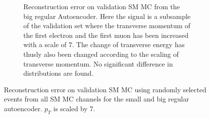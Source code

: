 \begin{figure}[h!]
\begin{subfigure}{.45\textwidth}
        \caption{Reconstruction error on validation SM MC from the big regular Autoencoder. Here the signal is a subsample of the validation 
        set where the transverse momentum of the first electron and the first muon has been increased with a scale of $7$. The change of transverse 
        energy has thusly also been changed according to the scaling of transverse momentum. No significant difference in distributions are found. }
        \label{fig:ae_big_pt_7}
    \end{subfigure}
    \hfill 
    \caption[AE | Reconstruction error $p_T$ altering of 7]{Reconstruction error on validation SM MC using randomly selected events from all SM MC channels for the small and big regular autoencoder. 
    $p_T$ is scaled by 7. }
    \label{fig:ae_big_small_pt_7}
\end{figure}

